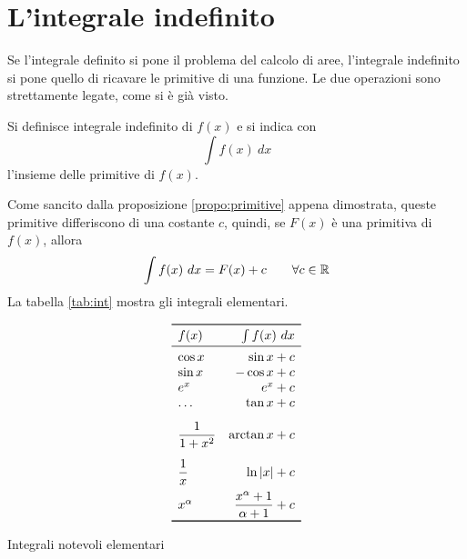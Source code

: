 %
%
%
%


\section{L'integrale indefinito}
Se l'integrale definito si pone il problema del calcolo di aree, l'integrale indefinito si pone quello di ricavare le primitive di una funzione. Le due operazioni sono strettamente legate, come si è già visto.
\begin{defin}
	Si definisce integrale indefinito di $f(x)$ e si indica con
	\[
		\int f(x)~dx
	\]
	l'insieme delle primitive di $f(x)$.
\end{defin}
Come sancito dalla proposizione \ref{propo:primitive} appena dimostrata, queste primitive differiscono di una costante $c$, quindi, se $F(x)$ è una primitiva di $f(x)$, allora
\[
	\int f(x)~dx=F(x)+c\qquad\forall c\in\mathbb{R}
\]
La tabella \ref{tab:int} mostra gli integrali elementari.
\begin{table}[ht]
	\centering
	\[
		\begin{array}{lr}
			\toprule
			f(x)             & \int f(x)~dx                    \\
			\midrule
			\cos x           & \sin x +c                       \\
			\sin x           & -\cos x +c                      \\
			e^x              & e^x +c                          \\
			\dots            & \tan x +c                       \\[2ex]
			\dfrac{1}{1+x^2} & \arctan x +c                    \\[3ex]
			\dfrac{1}{x}     & \ln\abs{x} +c                   \\[2ex]
			x^\alpha         & \dfrac{x^\alpha+1}{\alpha+1} +c \\
			\bottomrule
		\end{array}
	\]
	\caption{Integrali notevoli elementari}
	\label{tab:int}
\end{table}

